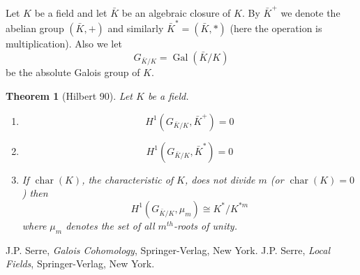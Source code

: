\documentclass[12pt]{article}
\newtheorem{thm}{Theorem}
\begin{document}
Let $K$ be a field and let $\bar{K}$ be an algebraic closure of
$K$. By $\bar{K}^+$ we denote the abelian group $(\bar{K},+)$ and
similarly $\bar{K}^{\ast}=(\bar{K},\ast)$ (here the operation is
multiplication). Also we let
$$G_{\bar{K}/K}=\operatorname{Gal}(\bar{K}/K)$$ be the absolute
Galois group of $K$.\\


\begin{thm}[Hilbert 90]
Let $K$ be a field.
\begin{enumerate}
\item $$ H^1(G_{\bar{K}/K},\bar{K}^+)=0$$

\item $$ H^1(G_{\bar{K}/K},\bar{K}^{\ast})=0$$

\item If $\operatorname{char}(K)$, the characteristic of $K$, does
not divide $m$ (or $\operatorname{char}(K)=0$) then
$$ H^1(G_{\bar{K}/K},{\mu}_m)\cong K^{\ast}/K^{\ast m}$$
where ${\mu}_m$ denotes the set of all $m^{th}$-roots of unity.
\end{enumerate}
\end{thm}

\begin{thebibliography}{9}
 J.P. Serre, {\em Galois Cohomology},
Springer-Verlag, New York.
 J.P. Serre, {\em Local Fields},
Springer-Verlag, New York.
\end{thebibliography}
\end{document}
